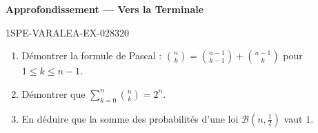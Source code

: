 \begin{center}\textbf{Approfondissement — Vers la Terminale}\end{center}
\begin{exercice}{1SPE-VARALEA-EX-028}{3}{20}
\begin{enumerate}
  \item Démontrer la formule de Pascal : $\binom{n}{k} = \binom{n-1}{k-1} + \binom{n-1}{k}$ pour $1 \leq k \leq n-1$.
  \item Démontrer que $\sum_{k=0}^{n} \binom{n}{k} = 2^n$.
  \item En déduire que la somme des probabilités d'une loi $\mathcal{B}(n, \frac{1}{2})$ vaut $1$.
\end{enumerate}
\end{exercice}
